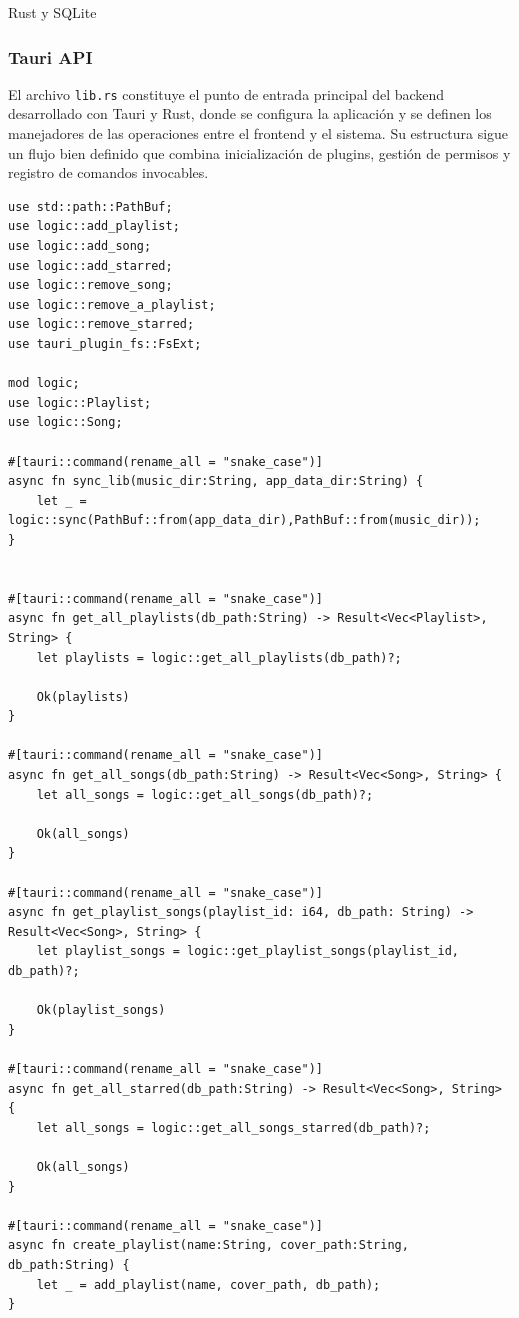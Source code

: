\documentclass[11pt, a4paper]{article}
\begin{document}
        Rust y SQLite

            \subsubsection{Tauri API}

            El archivo \verb|lib.rs| constituye el punto de entrada principal del backend desarrollado con Tauri y Rust, donde se configura la aplicación y se definen los manejadores de las operaciones entre el frontend y el sistema. Su estructura sigue un flujo bien definido que combina inicialización de plugins, gestión de permisos y registro de comandos invocables. \\

            \begin{lstlisting}[caption={lib.rs}]
use std::path::PathBuf;
use logic::add_playlist;
use logic::add_song;
use logic::add_starred;
use logic::remove_song;
use logic::remove_a_playlist;
use logic::remove_starred;
use tauri_plugin_fs::FsExt;

mod logic;
use logic::Playlist;
use logic::Song;

#[tauri::command(rename_all = "snake_case")]
async fn sync_lib(music_dir:String, app_data_dir:String) {
    let _ = logic::sync(PathBuf::from(app_data_dir),PathBuf::from(music_dir));
}


#[tauri::command(rename_all = "snake_case")]
async fn get_all_playlists(db_path:String) -> Result<Vec<Playlist>, String> {
    let playlists = logic::get_all_playlists(db_path)?;

    Ok(playlists)
}

#[tauri::command(rename_all = "snake_case")]
async fn get_all_songs(db_path:String) -> Result<Vec<Song>, String> {
    let all_songs = logic::get_all_songs(db_path)?;

    Ok(all_songs)
}

#[tauri::command(rename_all = "snake_case")]
async fn get_playlist_songs(playlist_id: i64, db_path: String) -> Result<Vec<Song>, String> {
    let playlist_songs = logic::get_playlist_songs(playlist_id, db_path)?;

    Ok(playlist_songs)
}

#[tauri::command(rename_all = "snake_case")]
async fn get_all_starred(db_path:String) -> Result<Vec<Song>, String> {
    let all_songs = logic::get_all_songs_starred(db_path)?;

    Ok(all_songs)
}

#[tauri::command(rename_all = "snake_case")]
async fn create_playlist(name:String, cover_path:String, db_path:String) {
    let _ = add_playlist(name, cover_path, db_path);
}


\end{lstlisting}
\end{document}
